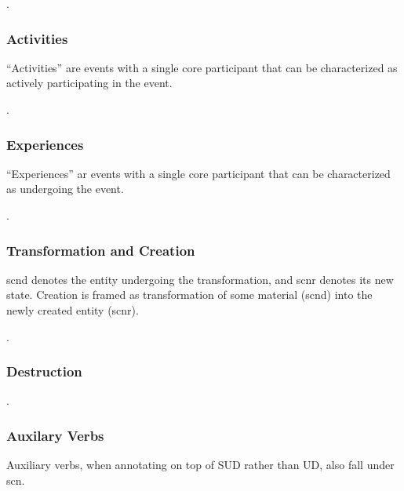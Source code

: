 \documentclass[a4paper]{article}
\begin{document}
\ex. 

\subsubsection{Activities}

``Activities'' are events with a single core participant that can be
characterized as actively participating in the event.

\ex. 

\subsubsection{Experiences}

``Experiences'' ar events with a single core participant that can be
characterized as undergoing the event.

\ex. 

\subsubsection{Transformation and Creation}

\textsf{scnd} denotes the entity undergoing the transformation, and
\textsf{scnr} denotes its new state. Creation is framed as transformation of
some material (\textsf{scnd}) into the newly created entity (\textsf{scnr}).

\ex. 

\subsubsection{Destruction}

\ex. 

\subsubsection{Auxilary Verbs}

Auxiliary verbs, when annotating on top of SUD rather than UD, also fall under
\textsf{scn}.
\end{document}
